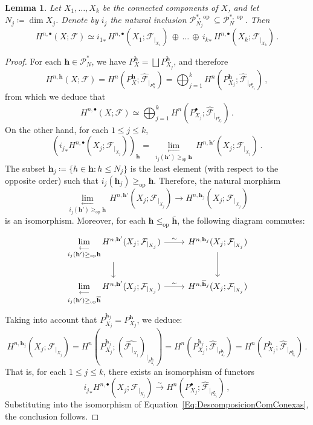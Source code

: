 \documentclass[reqno,12pt]{amsart}
\newcommand{\plim}[1]{\,\underset{#1}{\underset{\longleftarrow}{\lim}}\,}
\newcommand{\cF}{{\mathcal F}}
\newcommand{\cP}{\mathcal{P}}
\DeclareMathOperator{\op}{op}
\newcommand{\0}{\mathbf 0}
\newcommand{\h}{\mathbf{h}}
\newtheorem{lemma}[theorem]{Lemma}
\theoremstyle{definition}
\begin{document}
\begin{lemma}\label{Lem:DescomposicionComponentesConexas}
    Let $X_1,\dots,X_k$ be the connected components of $X$, and let $N_j\coloneqq \dim X_{j}$. Denote by $i_j$ the natural inclusion $\cP_{N_j}^{*,\op}\subseteq \cP^{*,\op}_N$. Then
    \begin{equation*}
        H^{n,\bullet}(X;\cF)\simeq {i_{1}}_*\,H^{n,\bullet}(X_1;\cF_{|_{X_1}})\,\oplus\,\dots\, \oplus\, {i_k}_*\,H^{n,\bullet}(X_k;\cF_{|_{X_k}})\, .
    \end{equation*}
\end{lemma}
\begin{proof}
    For each $\h\in \cP^{*}_N$, we have $P_X^{\h}=\bigsqcup P_{X_j}^\h$, and therefore
    \[
    H^{n,\h}(X;\cF)=H^{n}(P_X^\h;\widehat{\cF}_{|_{P_X^\h}})=\bigoplus_{j=1}^k H^n(P_{X_j}^\h;\widehat{\cF}_{|_{P_{X_j}^{\h}}})\, ,
    \]
    from which we deduce that
    \begin{equation}\label{Eq:DescomposicionComConexas}
        H^{n,\bullet}(X;\cF)\simeq \bigoplus_{j=1}^k H^{n}(P_{X_j}^\bullet;\widehat{\cF}_{|_{P_{X_j}^\bullet}})\,.
    \end{equation}
    On the other hand, for each $1\leq j\leq k$,
    \[
    \left({i_j}_* H^{n,\bullet}(X_j;\cF_{|_{X_j}})\right)_\h=
        \plim{i_j(\h')\geq_{\op} \h}H^{n,\h'}(X_j;\cF_{|_{X_j}})\, .
    \]
    The subset $\h_j\coloneqq \{h\in \h : h\leq N_j\}$ is the least element (with respect to the opposite order) such that $i_j(\h_j)\geq_{\op}\h$. Therefore, the natural morphism
    \[
    \plim{i_j(\h')\geq_{\op} \h}H^{n,\h'}(X_j;\cF_{|_{X_j}})\longrightarrow H^{n,\h_j}(X_j;\cF_{|_{X_j}})
    \]
    is an isomorphism. Moreover, for each $\h\leq_{\op} \overline{\h}$, the following diagram commutes:
    \[
    \begin{tikzcd}
        \plim{i_j(\h')\geq_{\op} \h}H^{n,\h'}(X_j;\cF_{|_{X_j}})\arrow[r,"\sim"]\arrow[d] & H^{n,\h_j}(X_j;\cF_{|_{X_j}})\arrow[d] \\
        \plim{i_j(\h')\geq_{\op} \overline{\h}}H^{n,\h'}(X_j;\cF_{|_{X_j}})\arrow[r,"\sim"] &  H^{n,\overline{\h}_j}(X_j;\cF_{|_{X_j}})
    \end{tikzcd}
    \]
    Taking into account that $P_{X_j}^{\h_j}=P_{X_j}^\h$, we deduce:
    \[
    H^{n,\h_j}(X_j;\cF_{|_{X_j}})=H^n(P_{X_j}^{\h_j};(\widehat{\cF_{|_{X_j}}})_{|_{P_{X_j}^{\h_j}}})=H^{n}(P_{X_j}^{\h_j};\widehat{\cF}_{|_{P_{X_j}^{\h_j}}})=H^n(P_{X_j}^\h;\widehat{\cF}_{|_{P_{X_j}^\h}})\,.
    \]
    That is, for each $1\leq j\leq k$, there exists an isomorphism of functors
    \[
    {i_j}_* H^{n,\bullet}(X_j;\cF_{|_{X_j}})\stackrel{\sim}\longrightarrow H^{n}(P_{X_j}^\bullet;\widehat{\cF}_{|_{P_{X_j}^\bullet}})\,, 
    \]
    Substituting into the isomorphism of Equation~\eqref{Eq:DescomposicionComConexas}, the conclusion follows.
\end{proof}
\end{document}
